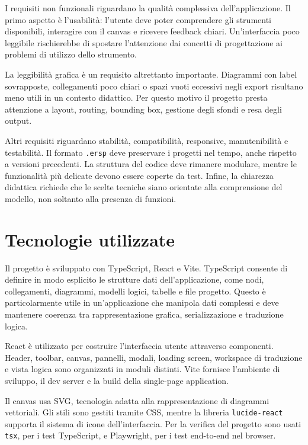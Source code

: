 \documentclass{unipd-thesis-modern}
\begin{document}
I requisiti non funzionali riguardano la qualità complessiva dell'applicazione. Il primo aspetto è l'usabilità: l'utente deve poter comprendere gli strumenti disponibili, interagire con il canvas e ricevere feedback chiari. Un'interfaccia poco leggibile rischierebbe di spostare l'attenzione dai concetti di progettazione ai problemi di utilizzo dello strumento.

La leggibilità grafica è un requisito altrettanto importante. Diagrammi con label sovrapposte, collegamenti poco chiari o spazi vuoti eccessivi negli export risultano meno utili in un contesto didattico. Per questo motivo il progetto presta attenzione a layout, routing, bounding box, gestione degli sfondi e resa degli output.

Altri requisiti riguardano stabilità, compatibilità, responsive, manutenibilità e testabilità. Il formato \texttt{.ersp} deve preservare i progetti nel tempo, anche rispetto a versioni precedenti. La struttura del codice deve rimanere modulare, mentre le funzionalità più delicate devono essere coperte da test. Infine, la chiarezza didattica richiede che le scelte tecniche siano orientate alla comprensione del modello, non soltanto alla presenza di funzioni.

\chapter{Tecnologie utilizzate}

Il progetto è sviluppato con TypeScript, React e Vite. TypeScript consente di definire in modo esplicito le strutture dati dell'applicazione, come nodi, collegamenti, diagrammi, modelli logici, tabelle e file progetto. Questo è particolarmente utile in un'applicazione che manipola dati complessi e deve mantenere coerenza tra rappresentazione grafica, serializzazione e traduzione logica.

React è utilizzato per costruire l'interfaccia utente attraverso componenti. Header, toolbar, canvas, pannelli, modali, loading screen, workspace di traduzione e vista logica sono organizzati in moduli distinti. Vite fornisce l'ambiente di sviluppo, il dev server e la build della single-page application.

Il canvas usa SVG, tecnologia adatta alla rappresentazione di diagrammi vettoriali. Gli stili sono gestiti tramite CSS, mentre la libreria \texttt{lucide-react} supporta il sistema di icone dell'interfaccia. Per la verifica del progetto sono usati \texttt{tsx}, per i test TypeScript, e Playwright, per i test end-to-end nel browser.
\end{document}
